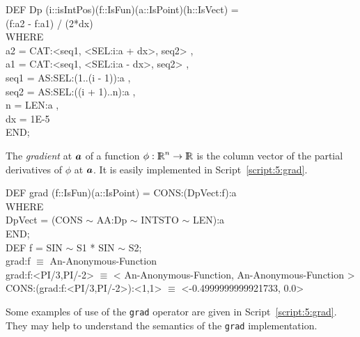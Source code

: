 \documentclass{31x47jw}
\begin{document}
\begin{script}
\begin{smallplasm} 
DEF Dp 
(i::isIntPos)(f::IsFun)(a::IsPoint)(h::IsVect) = \+\\
  (f:a2 - f:a1) / (2*dx) \-\\
WHERE \+\\
  a2 = CAT:<seq1, <SEL:i:a + dx>, seq2> , \\
  a1 = CAT:<seq1, <SEL:i:a - dx>, seq2> , \\
  seq1 = AS:SEL:(1..(i - 1)):a , \\
  seq2 = AS:SEL:((i + 1)..n):a , \\
  n = LEN:a ,\\
  dx = 1E-5\-\\
END;
\end{smallplasm} 
\label{script:5:Dp}
\end{script}

The \emph{gradient} at ${\mbox{\boldmath $a$}}$ of a function
$\phi:\mathbb{I\!\!R}^{n}\rightarrow\mathbb{I\!\!R}$ is the column vector of the partial
derivatives of $\phi$ at ${\mbox{\boldmath $a$}}$.  It is easily implemented in
Script~\ref{script:5:grad}.

\begin{script}
\begin{smallplasm} 
DEF grad  (f::IsFun)(a::IsPoint) = CONS:(DpVect:f):a\\
WHERE\+\\
  DpVect = (CONS  $\sim$  AA:Dp  $\sim$  INTSTO  $\sim$  LEN):a\-\\
END;\\[0.3cm]

DEF f = SIN $\sim$ S1 * SIN $\sim$ S2;\\[0.3cm]
grad:f 
$\equiv$ An-Anonymous-Function \\

grad:f:<PI/3,PI/-2>
$\equiv$ < An-Anonymous-Function, An-Anonymous-Function >\\

CONS:(grad:f:<PI/3,PI/-2>):<1,1>
$\equiv$ <-0.4999999999921733, 0.0>
\end{smallplasm} 
\label{script:5:grad}
\end{script}

Some examples of use of the \texttt{grad} operator are given in 
Script~\ref{script:5:grad}.  They may help to understand the semantics of the
\texttt{grad} implementation.
\end{document}
